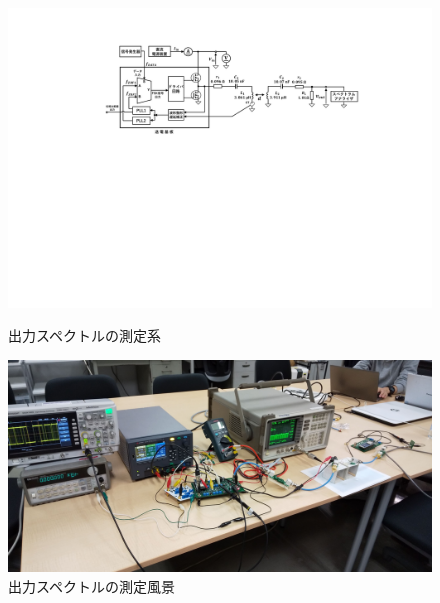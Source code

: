 \begin{figure}[p]
\begin{center}

\includegraphics[width=160mm]{figures/spectrum.pdf}
  \caption{出力スペクトルの測定系}
  \label{spectrum}
\vspace{2cm}

\includegraphics[width=160mm]{figures/spectrumphoto.jpg}
  \caption{出力スペクトルの測定風景}
  \label{spectrumphoto}
  \end{center}
\end{figure}

